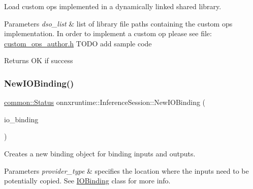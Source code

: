 Load custom ops implemented in a dynamically linked shared library. 
\begin{DoxyParams}{Parameters}
{\em dso\+\_\+list} & list of library file paths containing the custom ops implementation. In order to implement a custom op please see file\+: \mbox{\hyperlink{custom__ops__author_8h}{custom\+\_\+ops\+\_\+author.\+h}} T\+O\+DO add sample code \\
\hline
\end{DoxyParams}
\begin{DoxyReturn}{Returns}
OK if success 
\end{DoxyReturn}
\mbox{\label{classonnxruntime_1_1InferenceSession_a1cdd5e4a373360fc01377678ad059822}} 
\subsubsection{\texorpdfstring{New\+I\+O\+Binding()}{NewIOBinding()}}
{\footnotesize\ttfamily \mbox{\hyperlink{classonnxruntime_1_1common_1_1Status}{common\+::\+Status}} onnxruntime\+::\+Inference\+Session\+::\+New\+I\+O\+Binding (\begin{DoxyParamCaption}\item[{std\+::unique\+\_\+ptr$<$ \mbox{\hyperlink{classonnxruntime_1_1IOBinding}{I\+O\+Binding}} $>$ $\ast$}]{io\+\_\+binding }\end{DoxyParamCaption})}

Creates a new binding object for binding inputs and outputs. 
\begin{DoxyParams}{Parameters}
{\em provider\+\_\+type} & specifies the location where the inputs need to be potentially copied. See \mbox{\hyperlink{classonnxruntime_1_1IOBinding}{I\+O\+Binding}} class for more info. \\
\hline
\end{DoxyParams}
\mbox{\label{classonnxruntime_1_1InferenceSession_a4118c53534b5927473a86f0c1323cf6c}} 
